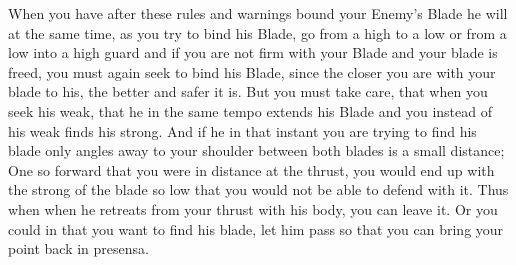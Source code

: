 When you have after these rules and warnings bound your Enemy's Blade
he will at the same time, as you try to bind his Blade, go from a high
to a low or from a low into a high guard and if you are not firm with
your Blade and your blade is freed, you must again seek to bind his
Blade, since the closer you are with your blade to his, the better and
safer it is. But you must take care, that when you seek his weak, that
he in the same tempo extends his Blade and you instead of his weak
finds his strong. And if he in that instant you are trying to find his
blade only angles away to your shoulder between both blades is a
small distance; One so forward that you were in distance at the
thrust, you would end up with the strong of the blade so low that you
would not be able to defend with it. Thus when when he retreats from
your thrust with his body, you can leave it. Or you could in that you
want to find his blade, let him pass so that you can bring your point
back in presensa.


